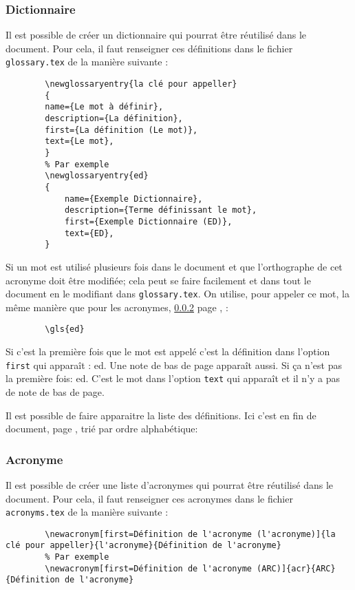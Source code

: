 \subsubsection{Dictionnaire} \label{dictionnaire}
Il est possible de créer un dictionnaire qui pourrat être réutilisé dans le document.
Pour cela, il faut renseigner ces définitions dans le fichier \verb=glossary.tex= de la manière suivante :
\begin{code}
    \begin{verbatim}
        \newglossaryentry{la clé pour appeller}
        {
        name={Le mot à définir},
        description={La définition},
        first={La définition (Le mot)},
        text={Le mot},
        }
        % Par exemple
        \newglossaryentry{ed}
        {
            name={Exemple Dictionnaire},
            description={Terme définissant le mot},
            first={Exemple Dictionnaire (ED)},
            text={ED},
        }
\end{verbatim}
    \caption{Définition d'en le dictionnaire}
\end{code}

Si un mot est utilisé plusieurs fois dans le document et que l'orthographe de cet acronyme doit être modifiée;
cela peut se faire facilement et dans tout le document en le modifiant dans \verb=glossary.tex=.
On utilise, pour appeler ce mot, la même manière que pour les acronymes, \ref{acronyme} page \pageref{acronyme}, :
\begin{code}
    \begin{verbatim}
        \gls{ed}
\end{verbatim}
    \caption{Utilisation du dictionnaire}
\end{code}

Si c'est la première fois que le mot est appelé c'est la définition dans l'option \verb=first= qui apparaît : \gls{ed}.
Une note de bas de page apparaît aussi. \newline
Si ça n'est pas la première fois: \gls{ed}. C'est le mot dans l'option \verb=text= qui apparaît et il n'y a pas de note de bas de page.

Il est possible de faire apparaitre la liste des définitions. Ici c'est en fin de document,
page \pageref{dictionnaireDomaine}, trié par ordre alphabétique:

\subsubsection{Acronyme} \label{acronyme}
Il est possible de créer une liste d'acronymes qui pourrat être réutilisé dans le document.
Pour cela, il faut renseigner ces acronymes dans le fichier \verb=acronyms.tex= de la manière suivante :
\begin{code}
    \begin{verbatim}
        \newacronym[first=Définition de l'acronyme (l'acronyme)]{la clé pour appeller}{l'acronyme}{Définition de l'acronyme}
        % Par exemple
        \newacronym[first=Définition de l'acronyme (ARC)]{acr}{ARC}{Définition de l'acronyme}
\end{verbatim}
    \caption{Définition d'un acronyme}
\end{code}

